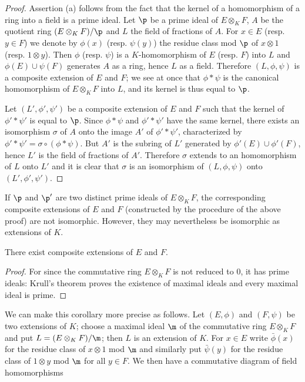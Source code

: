 \begin{proof}
Assertion (a) follows from the fact that the kernel of a homomorphism of a ring into a field is a prime ideal. Let $\p$ be a prime ideal of $E\otimes_KF$, $A$ be the quotient ring $(E\otimes_KF)/\p$ and $L$ the field of fractions of $A$. For $x\in E$ (resp. $y\in F$) we denote by $\phi(x)$ (resp. $\psi(y)$) the residue class mod $\p$ of $x\otimes 1$ (resp. $1\otimes y$). Then $\phi$ (resp. $\psi$) is a $K$-homomorphism of $E$ (resp. $F$) into $L$ and $\phi(E)\cup\psi(F)$ generates $A$ as a ring, hence $L$ as a field. Therefore $(L,\phi,\psi)$ is a composite extension of $E$ and $F$; we see at once that $\phi\ast\psi$ is the canonical homomorphism of $E\otimes_KF$ into $L$, and its kernel is thus equal to $\p$.\par
Let $(L',\phi',\psi')$ be a composite extension of $E$ and $F$ such that the kernel of $\phi'\ast\psi'$ is equal to $\p$. Since $\phi\ast\psi$ and $\phi'\ast\psi'$ have the same kernel, there exists an isomorphism $\sigma$ of $A$ onto the image $A'$ of $\phi'\ast\psi'$, characterized by $\phi'\ast\psi'=\sigma\circ(\phi\ast\psi)$. But $A'$ is the subring of $L'$ generated by $\phi'(E)\cup\phi'(F)$, hence $L'$ is the field of fractions of $A'$. Therefore $\sigma$ extends to an homomorphism of $L$ onto $L'$ and it is clear that $\sigma$ is an isomorphism of $(L,\phi,\psi)$ onto $(L',\phi',\psi')$.
\end{proof}
\begin{remark}
If $\p$ and $\p'$ are two distinct prime ideals of $E\otimes_KF$, the corresponding composite extensions of $E$ and $F$ (constructed by the procedure of the above proof) are not isomorphic. However, they may nevertheless be isomorphic as extensions of $K$.
\end{remark}
\begin{corollary}
There exist composite extensions of $E$ and $F$.
\end{corollary}
\begin{proof}
For since the commutative ring $E\otimes_KF$ is not reduced to $0$, it has prime ideals: Krull's theorem proves the existence of maximal ideals and every maximal ideal is prime.
\end{proof}
We can make this corollary more precise as follows. Let $(E,\phi)$ and $(F,\psi)$ be two extensions of $K$; choose a maximal ideal $\m$ of the commutative ring $E\otimes_KF$ and put $L=(E\otimes_KF)/\m$; then $L$ is an extension of $K$. For $x\in E$ write $\bar{\phi}(x)$ for the residue class of $x\otimes 1$ mod $\m$ and similarly put $\bar{\psi}(y)$ for the residue class of $1\otimes y$ mod $\m$ for all $y\in F$. We then have a commutative diagram of field homomorphisms
